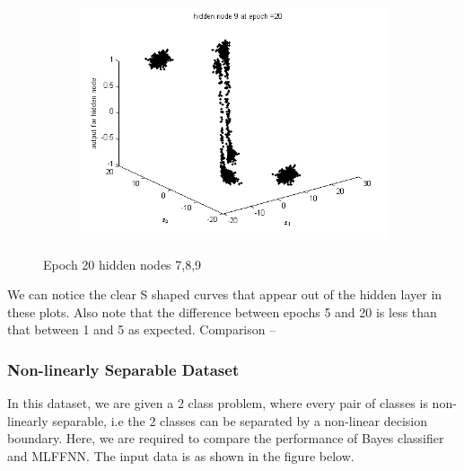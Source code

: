 \documentclass{article}
\begin{document}
\begin{flushleft}
\begin{figure}
\begin{subfigure}{.3\textwidth}
\end{subfigure}
\begin{subfigure}{.3\textwidth}
  \centering
  \includegraphics[width=.8\linewidth]{Classification/linearlySeparable/h20_9}
  
\end{subfigure}
\caption{Epoch 20 hidden nodes 7,8,9}
\end{figure}
We can notice the clear S shaped curves that appear out of the hidden layer in these plots. Also note that the difference between epochs 5 and 20 is less than that between 1 and 5 as expected.
\newpage
Comparison --
\end{flushleft}

\subsubsection{Non-linearly Separable Dataset}
\begin{flushleft}

In this dataset, we are given a 2 class problem, where every pair of classes is non-linearly separable, i.e the 2 classes can be separated by a non-linear decision boundary. Here, we are required to compare the performance of Bayes classifier and MLFFNN.
The input data is as shown in the figure below. \\[10pt]

\end{flushleft}
\end{document}
